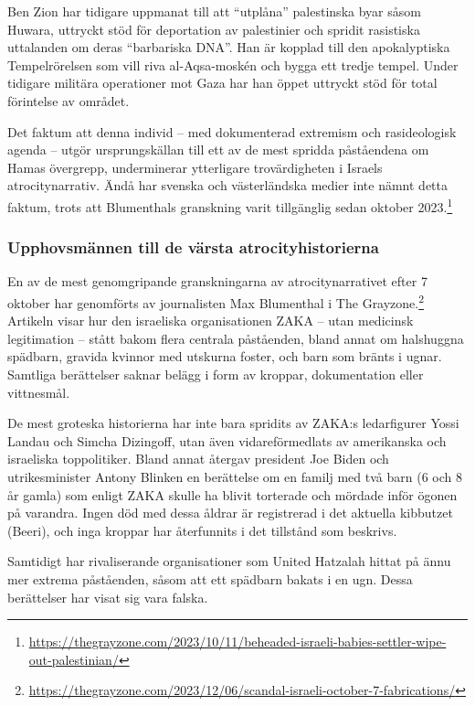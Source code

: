 Ben Zion har tidigare uppmanat till att “utplåna” palestinska byar såsom Huwara, uttryckt stöd för deportation av palestinier och spridit rasistiska uttalanden om deras “barbariska DNA”. Han är kopplad till den apokalyptiska Tempelrörelsen som vill riva al-Aqsa-moskén och bygga ett tredje tempel. Under tidigare militära operationer mot Gaza har han öppet uttryckt stöd för total förintelse av området.

Det faktum att denna individ – med dokumenterad extremism och rasideologisk agenda – utgör ursprungskällan till ett av de mest spridda påståendena om Hamas övergrepp, underminerar ytterligare trovärdigheten i Israels atrocitynarrativ. Ändå har svenska och västerländska medier inte nämnt detta faktum, trots att Blumenthals granskning varit tillgänglig sedan oktober 2023.\footnote{\url{https://thegrayzone.com/2023/10/11/beheaded-israeli-babies-settler-wipe-out-palestinian/}}

\subsubsection*{Upphovsmännen till de värsta atrocityhistorierna}

En av de mest genomgripande granskningarna av atrocitynarrativet efter 7 oktober har genomförts av journalisten Max Blumenthal i The Grayzone.\footnote{\url{https://thegrayzone.com/2023/12/06/scandal-israeli-october-7-fabrications/}} Artikeln visar hur den israeliska organisationen ZAKA – utan medicinsk legitimation – stått bakom flera centrala påståenden, bland annat om halshuggna spädbarn, gravida kvinnor med utskurna foster, och barn som bränts i ugnar. Samtliga berättelser saknar belägg i form av kroppar, dokumentation eller vittnesmål.  

De mest groteska historierna har inte bara spridits av ZAKA:s ledarfigurer Yossi Landau och Simcha Dizingoff, utan även vidareförmedlats av amerikanska och israeliska toppolitiker. Bland annat återgav president Joe Biden och utrikesminister Antony Blinken en berättelse om en familj med två barn (6 och 8 år gamla) som enligt ZAKA skulle ha blivit torterade och mördade inför ögonen på varandra. Ingen död med dessa åldrar är registrerad i det aktuella kibbutzet (Beeri), och inga kroppar har återfunnits i det tillstånd som beskrivs.

Samtidigt har rivaliserande organisationer som United Hatzalah hittat på ännu mer extrema påståenden, såsom att ett spädbarn bakats i en ugn. Dessa berättelser har visat sig vara falska.


